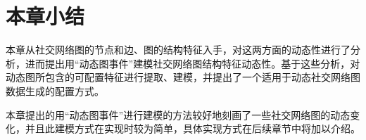 \section{本章小结}

本章从社交网络图的节点和边、图的结构特征入手，对这两方面的动态性进行了分析，进而提出用“动态图事件”建模社交网络图结构特征动态性。基于这些分析，对动态图所包含的可配置特征进行提取、建模，并提出了一个适用于动态社交网络图数据生成的配置方式。

本章提出的用“动态图事件”进行建模的方法较好地刻画了一些社交网络图的动态变化，并且此建模方式在实现时较为简单，具体实现方式在后续章节中将加以介绍。